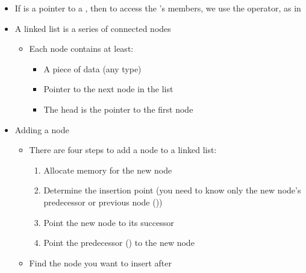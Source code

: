 \begin{itemize}

  \item If  is a pointer to a , then to access the 's members, we use the \code{->} operator, as in 

  \item A linked list is a series of connected nodes

    \begin{itemize}

      \item Each node contains at least:

        \begin{itemize}

          \item A piece of data (any type)

          \item Pointer to the next node in the list

          \item The head is the pointer to the first node

        \end{itemize}

    \end{itemize}

  \item Adding a node

    \begin{itemize}

      \item There are four steps to add a node to a linked list:

        \begin{enumerate}

          \item Allocate memory for the new node

          \item Determine the insertion point (you need to know only the new node's predecessor or previous node ())

          \item Point the new node to its successor

          \item Point the predecessor () to the new node

        \end{enumerate}

      \item Find the node you want to insert after


\end{itemize}
\end{itemize}
